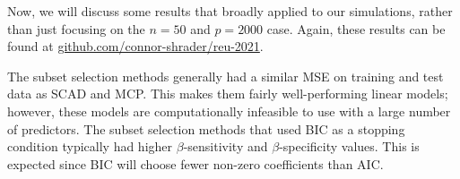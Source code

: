 \documentclass{article}
\begin{document}

	
	Now, we will discuss some results that broadly applied to our simulations, rather than just focusing on the $n = 50$ and $p = 2000$ case. Again, these results can be found at \href{https://github.com/connor-shrader/reu-2021}{github.com/connor-shrader/reu-2021}.
	
	The subset selection methods generally had a similar MSE on training and test data as SCAD and MCP. This makes them fairly well-performing linear models; however, these models are computationally infeasible to use with a large number of predictors. The subset selection methods that used BIC as a stopping condition typically had higher $\beta$-sensitivity and $\beta$-specificity values. This is expected since BIC will choose fewer non-zero coefficients than AIC.
	
\end{document}
